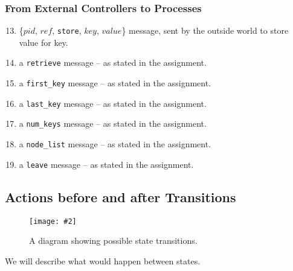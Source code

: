 \documentclass[11pt]{article}
\newcommand{\pic}[2]{\begin{center}\texttt{[image: \#2]}\end{center}}
\begin{document}
\subsubsection{From External Controllers to Processes}
\begin{enumerate}[M1]
\setcounter{enumi}{12}
\newcommand{\store}{\texttt{store}}
\newcommand{\retrieve}{\texttt{retrieve}}
\newcommand{\firstKey}{\texttt{first\_key}}
\newcommand{\lastKey}{\texttt{last\_key}}
\newcommand{\numKeys}{\texttt{num\_keys}}
\newcommand{\nodeList}{\texttt{node\_list}}
\newcommand{\leave}{\texttt{leave}}

\item \{$pid$, $ref$, \store, $key$, $value$\} message, sent by the outside world to store value for key.
\item a {\retrieve} message -- as stated in the assignment.
\item a {\firstKey} message -- as stated in the assignment.
\item a {\lastKey} message -- as stated in the assignment.
\item a {\numKeys} message -- as stated in the assignment.
\item a {\nodeList} message -- as stated in the assignment.
\item a {\leave} message  -- as stated in the assignment.
\end{enumerate}


\subsection{Actions before and after Transitions}
\begin{figure}[H]
\pic{0.6}{diagram}
\label{fig:diagram}
\caption{A diagram showing possible state transitions.}
\end{figure}

We will describe what would happen between states.
\end{document}
